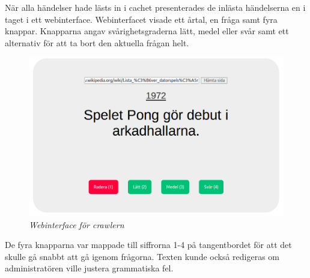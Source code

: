 \documentclass[a4paper, 11pt]{article}
\begin{document}
När alla  händelser hade lästs in i cachet presenterades de inlästa händelserna en i taget i ett webinterface. Webinterfacet visade ett årtal, en fråga samt fyra knappar. Knapparna angav svårighetsgraderna lätt, medel eller svår samt ett alternativ för att ta bort den aktuella frågan helt.

\begin{figure}[H]
	\begin{centering}
	\includegraphics[width=\textwidth]{crawler} 
	\end{centering}
	\caption{\textit{Webinterface för crawlern}}
\end{figure}

De fyra knapparna var mappade till siffrorna 1-4 på tangentbordet för att det skulle gå snabbt att gå igenom frågorna. Texten kunde också redigeras om administratören ville justera grammatiska fel.
\end{document}
